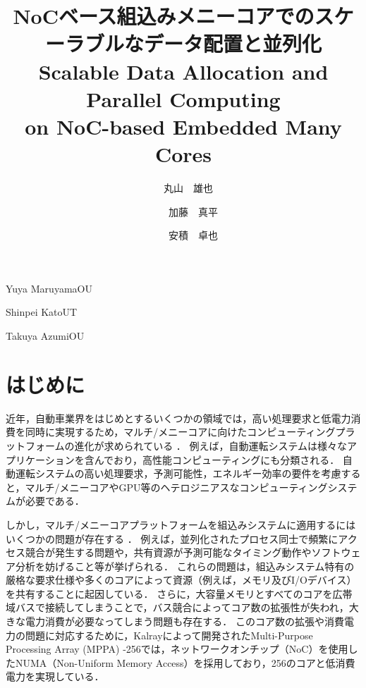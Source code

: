 \documentclass[submit,techrep]{ipsj_v2/UTF8/ipsj}
\begin{document}
\title{
    {\Huge NoCベース組込みメニーコアでのスケーラブルなデータ配置と並列化}
  \\{\huge Scalable Data Allocation and Parallel Computing \\ on NoC-based Embedded Many Cores}
}

\etitle{\vspace{-3.5cm}}



\author{　{\LARGE 丸山　雄也}}{{\Large Yuya Maruyama}}{OU}%
\author{　　{\LARGE 加藤　真平}}{{\Large Shinpei Kato}}{UT}%
\author{　　{\LARGE 安積　卓也}}{{\Large Takuya Azumi}}{OU}%

\maketitle

\pagestyle{empty} \thispagestyle{fancy}

\section{はじめに}
近年，自動車業界をはじめとするいくつかの領域では，高い処理要求と低電力消費を同時に実現するため，マルチ/メニーコアに向けたコンピューティングプラットフォームの進化が求められている \cite{becker2016contention} \cite{faragardi2014communication} \cite{perret2016mapping}．
例えば，自動運転システムは様々なアプリケーションを含んでおり，高性能コンピューティングにも分類される．
自動運転システムの高い処理要求，予測可能性，エネルギー効率の要件を考慮すると，マルチ/メニーコアやGPU等のヘテロジニアスなコンピューティングシステムが必要である．

しかし，マルチ/メニーコアプラットフォームを組込みシステムに適用するにはいくつかの問題が存在する \cite{becker2016contention} \cite{saidi2015shift}．
例えば，並列化されたプロセス同士で頻繁にアクセス競合が発生する問題や，共有資源が予測可能なタイミング動作やソフトウェア分析を妨げること等が挙げられる．
これらの問題は，組込みシステム特有の厳格な要求仕様や多くのコアによって資源（例えば，メモリ及びI/Oデバイス）を共有することに起因している．
さらに，大容量メモリとすべてのコアを広帯域バスで接続してしまうことで，バス競合によってコア数の拡張性が失われ，大きな電力消費が必要なってしまう問題も存在する．
このコア数の拡張や消費電力の問題に対応するために，Kalrayによって開発されたMulti-Purpose Processing Array (MPPA) -256では，ネットワークオンチップ（NoC）を使用したNUMA（Non-Uniform Memory Access）を採用しており，256のコアと低消費電力を実現している．
\end{document}
